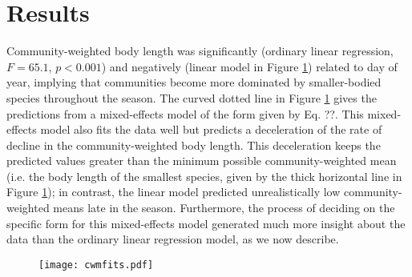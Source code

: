 \documentclass[12pt]{ecology}
\begin{document}
\section{Results}

Community-weighted body length was significantly (ordinary linear regression, $F = 65.1$, $p < 0.001$) and negatively (linear model in Figure \ref{fig:cwmfits}) related to day of year, implying that communities become more dominated by smaller-bodied species throughout the season.  The curved dotted line in Figure \ref{fig:cwmfits} gives the predictions from a mixed-effects model of the form given by Eq. ??.  This mixed-effects model also fits the data well but predicts a deceleration of the rate of decline in the community-weighted body length.  This deceleration keeps the predicted values greater than the minimum possible community-weighted mean (i.e. the body length of the smallest species, given by the thick horizontal line in Figure \ref{fig:cwmfits}); in contrast, the linear model predicted unrealistically low community-weighted means late in the season.  Furthermore, the process of deciding on the specific form for this mixed-effects model generated much more insight about the data than the ordinary linear regression model, as we now describe.

\begin{figure}
\texttt{[image: cwmfits.pdf]}
\caption{}
\label{fig:cwmfits}
\end{figure}
\end{document}
